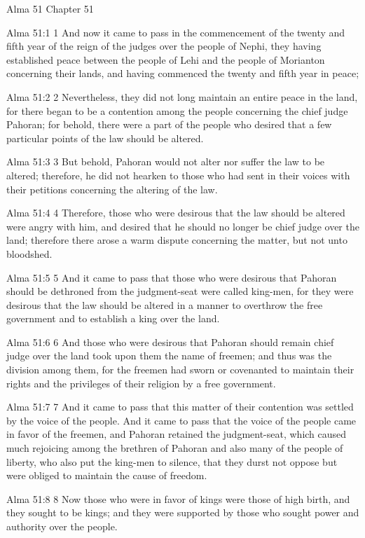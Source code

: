 Alma 51
Chapter 51

Alma 51:1
 1 And now it came to pass in the commencement of the twenty and
fifth year of the reign of the judges over the people of Nephi,
they having established peace between the people of Lehi and the
people of Morianton concerning their lands, and having commenced
the twenty and fifth year in peace;

Alma 51:2
 2 Nevertheless, they did not long maintain an entire peace in
the land, for there began to be a contention among the people
concerning the chief judge Pahoran; for behold, there were a part
of the people who desired that a few particular points of the law
should be altered.

Alma 51:3
 3 But behold, Pahoran would not alter nor suffer the law to be
altered; therefore, he did not hearken to those who had sent in
their voices with their petitions concerning the altering of the
law.

Alma 51:4
 4 Therefore, those who were desirous that the law should be
altered were angry with him, and desired that he should no longer
be chief judge over the land; therefore there arose a warm
dispute concerning the matter, but not unto bloodshed.

Alma 51:5
 5 And it came to pass that those who were desirous that Pahoran
should be dethroned from the judgment-seat were called king-men,
for they were desirous that the law should be altered in a manner
to overthrow the free government and to establish a king over the
land.

Alma 51:6
 6 And those who were desirous that Pahoran should remain chief
judge over the land took upon them the name of freemen; and thus
was the division among them, for the freemen had sworn or
covenanted to maintain their rights and the privileges of their
religion by a free government.

Alma 51:7
 7 And it came to pass that this matter of their contention was
settled by the voice of the people. And it came to pass that the
voice of the people came in favor of the freemen, and Pahoran
retained the judgment-seat, which caused much rejoicing among the
brethren of Pahoran and also many of the people of liberty, who
also put the king-men to silence, that they durst not oppose but
were obliged to maintain the cause of freedom.

Alma 51:8
 8 Now those who were in favor of kings were those of high birth,
and they sought to be kings; and they were supported by those who
sought power and authority over the people.

